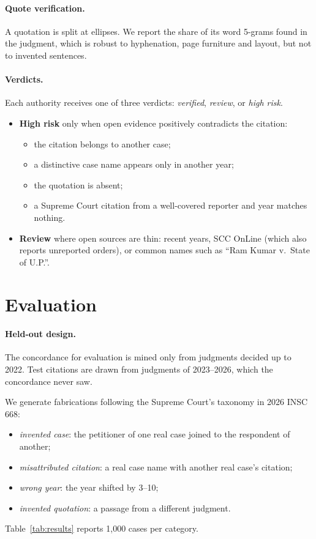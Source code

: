 \documentclass[sigconf,nonacm]{acmart}
\begin{document}
\paragraph{Quote verification.}
A quotation is split at ellipses. We report the share of its word 5-grams found in the judgment, which
is robust to hyphenation, page furniture and layout, but not to invented sentences.

\paragraph{Verdicts.}
Each authority receives one of three verdicts: \emph{verified}, \emph{review}, or \emph{high risk}.
\begin{itemize}
\item \textbf{High risk} only when open evidence positively contradicts the citation:
\begin{itemize}
\item the citation belongs to another case;
\item a distinctive case name appears only in another year;
\item the quotation is absent;
\item a Supreme Court citation from a well-covered reporter and year matches nothing.
\end{itemize}
\item \textbf{Review} where open sources are thin: recent years, SCC OnLine (which also reports
unreported orders), or common names such as ``Ram Kumar v.\ State of U.P.''.
\end{itemize}

\section{Evaluation}

\paragraph{Held-out design.}
The concordance for evaluation is mined only from judgments decided up to 2022. Test citations are
drawn from judgments of 2023--2026, which the concordance never saw.

We generate fabrications following the Supreme Court's taxonomy in 2026 INSC 668:
\begin{itemize}
\item \emph{invented case}: the petitioner of one real case joined to the respondent of another;
\item \emph{misattributed citation}: a real case name with another real case's citation;
\item \emph{wrong year}: the year shifted by 3--10;
\item \emph{invented quotation}: a passage from a different judgment.
\end{itemize}
Table~\ref{tab:results} reports 1,000 cases per category.
\end{document}
